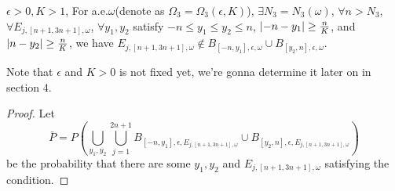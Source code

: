 \begin{thm}\label{omega3}
   $\epsilon>0,K>1$, For a.e.$\omega$(denote as $\Omega_3=\Omega_3(\epsilon,K)$), $\exists N_3=N_3(\omega)$, $\forall n>N_3$, $\forall E_{j,[n+1,3n+1],\omega}$, $\forall y_1,y_2$ satisfy $-n\leq y_1\leq y_2\leq n$,  $\lvert-n-y_1\rvert\geq\frac{n}{K}$, and $\lvert n-y_2\rvert\geq\frac{n}{K}$,
 we have $E_{j,[n+1,3n+1],\omega}\notin B_{[-n,y_1],\epsilon,\omega}\cup B_{[y_2,n],\epsilon,\omega}$.
\end{thm}
\begin{remark}
  Note that $\epsilon$ and $K>0$ is not fixed yet, we're gonna determine it later on in section 4.
\end{remark}

\begin{proof}
Let
\[
  \bar{P}=P\left(\bigcup\limits_{y_1,y_2}\bigcup\limits_{j=1}^{2n+1}
  B_{[-n,y_1],\epsilon,E_{j,[n+1,3n+1],\omega}}\cup B_{[y_2,n],\epsilon,E_{j,[n+1,3n+1],\omega}}\right)
\]
be the probability that there are some $y_1,y_2$ and $E_{j,[n+1,3n+1],\omega}$ satisfying the condition.

\end{proof}
